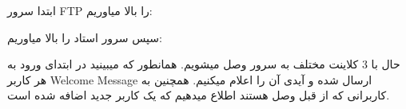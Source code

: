 {
}




ابتدا سرور FTP را بالا میاوریم: 

{
}


سپس سرور استاد را بالا میاوریم: 

{
}

\pagebreak

حال با 3 کلاینت مختلف به سرور وصل میشویم. همانطور که میبینید در ابتدای ورود به هر کاربر Welcome Message ارسال شده و آیدی آن را اعلام میکنیم. همچنین به کاربرانی که از قبل  وصل هستند اطلاع میدهیم که یک کاربر جدید اضافه شده است.

{
}

{
}

